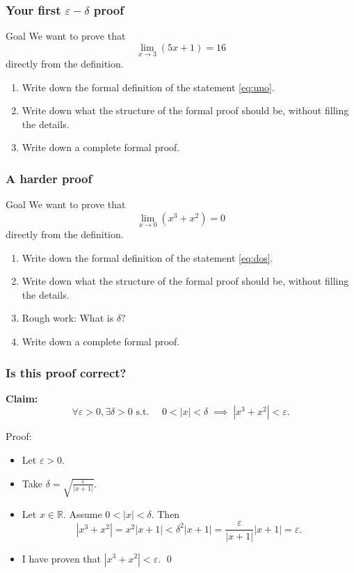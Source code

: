 \documentclass[14pt]{beamer}
\newcommand {\DS} [1] {${\displaystyle #1}$}
\newcommand {\R}{\mathbb{R}}
\newcommand{\e}{\varepsilon}
\newcommand{\p}{\pause}
\begin{document}
\begin{frame}[t]
\frametitle{Your first $\e-\delta$ proof}

\begin{block}{Goal}
	We want to prove that
		\begin{equation} \label{eq:uno}
			\lim_{x \to 3} \left( 5x + 1 \right) = 16
		\end{equation}
	directly from the definition.
\end{block}
\vfill 
\begin{enumerate}
\p		\item  Write down the formal definition of the statement \eqref{eq:uno}.
\p		\item  Write down what the structure of the formal proof should be, without filling the details.
\p		\item  Write down a complete formal proof.
\end{enumerate}
\vfill
\end{frame}

\begin{frame}
\frametitle{A harder proof}

\begin{block}{Goal}
	We want to prove that
		\begin{equation} \label{eq:dos}
			\lim_{x \to 0} \left( x^3 + x^2 \right) = 0
		\end{equation}
	directly from the definition.
\end{block}
\vfill 
\begin{enumerate}
\pause	\item  Write down the formal definition of the statement \eqref{eq:dos}.
\pause	\item  Write down what the structure of the formal proof should be, without filling the details.
\pause	\item  Rough work:  What is $\delta?$
\pause	\item  Write down a complete formal proof.
\end{enumerate}
\vfill

\end{frame}
\begin{frame}[t]
\frametitle{Is this proof correct?}

{\bf Claim:}
	$$
		\forall \e >0, \exists \delta>0 \mbox{ s.t. }  \quad 0<|x|<\delta \; \implies \;  |x^3+x^2| < \e.
	$$
\vfill
\begin{block}{Proof:}
	\begin{itemize}
		\item  Let $\e >0$.
		\item  Take \DS{\delta = \sqrt{\frac{\e}{|x+1|}}}.
		\item Let $x \in \R$.  Assume $0 < |x| < \delta$.  Then
			$$
				|x^3+x^2| = x^2 | x + 1| < \delta^2 |x+1| = \frac{\e}{|x+1|} |x+1| = \e.
			$$
		\item	 I have proven that \DS{|x^3+x^2| < \e}. 
		\hfill \qed
	\end{itemize}
\end{block}

\vfill

\end{frame}
\end{document}
